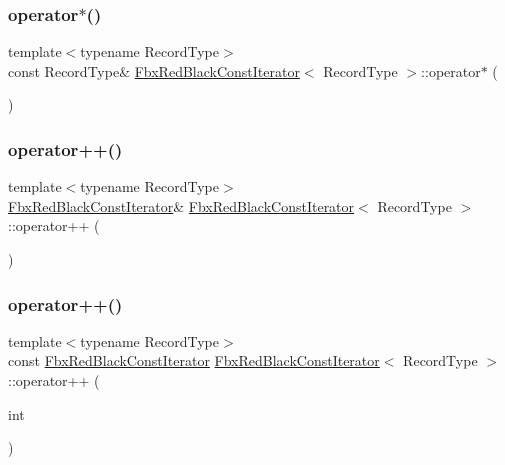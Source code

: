 \subsubsection{\texorpdfstring{operator$\ast$()}{operator*()}\hspace{0.1cm}{\footnotesize\ttfamily [2/2]}}
{\footnotesize\ttfamily template$<$typename Record\+Type$>$ \\
const Record\+Type\& \hyperlink{class_fbx_red_black_const_iterator}{Fbx\+Red\+Black\+Const\+Iterator}$<$ Record\+Type $>$\+::operator$\ast$ (\begin{DoxyParamCaption}{ }\end{DoxyParamCaption})}

\mbox{\label{class_fbx_red_black_const_iterator_a75bbaa3d7e877d62ad4c925251c9a0c4}} 
\subsubsection{\texorpdfstring{operator++()}{operator++()}\hspace{0.1cm}{\footnotesize\ttfamily [1/2]}}
{\footnotesize\ttfamily template$<$typename Record\+Type$>$ \\
\hyperlink{class_fbx_red_black_const_iterator}{Fbx\+Red\+Black\+Const\+Iterator}\& \hyperlink{class_fbx_red_black_const_iterator}{Fbx\+Red\+Black\+Const\+Iterator}$<$ Record\+Type $>$\+::operator++ (\begin{DoxyParamCaption}{ }\end{DoxyParamCaption})}

\mbox{\label{class_fbx_red_black_const_iterator_a6f685ed6ec9a5ce0bb540d8895e20a92}} 
\subsubsection{\texorpdfstring{operator++()}{operator++()}\hspace{0.1cm}{\footnotesize\ttfamily [2/2]}}
{\footnotesize\ttfamily template$<$typename Record\+Type$>$ \\
const \hyperlink{class_fbx_red_black_const_iterator}{Fbx\+Red\+Black\+Const\+Iterator} \hyperlink{class_fbx_red_black_const_iterator}{Fbx\+Red\+Black\+Const\+Iterator}$<$ Record\+Type $>$\+::operator++ (\begin{DoxyParamCaption}\item[{int}]{ }\end{DoxyParamCaption})}

